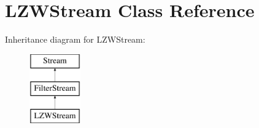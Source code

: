 \hypertarget{class_l_z_w_stream}{}\section{L\+Z\+W\+Stream Class Reference}
\label{class_l_z_w_stream}
Inheritance diagram for L\+Z\+W\+Stream\+:\begin{figure}[H]
\begin{center}
\leavevmode
\includegraphics[height=3.000000cm]{class_l_z_w_stream}
\end{center}
\end{figure}
